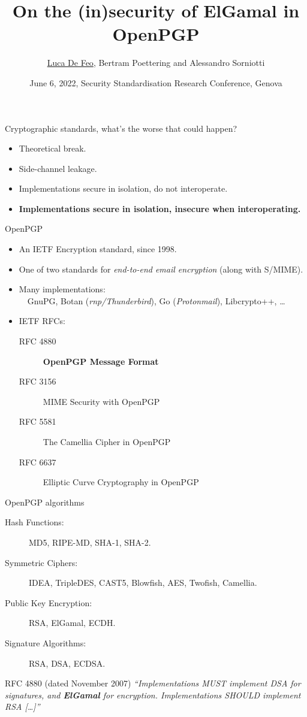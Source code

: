 \documentclass[aspectratio=169]{beamer}
\title{On the (in)security of ElGamal in OpenPGP}
\author[De Feo, Poettering, Sorniotti]{\uline{Luca De Feo}, Bertram Poettering and Alessandro Sorniotti}
\date[June 6, 2022, SSR Genova]{June 6, 2022, Security Standardisation Research Conference, Genova}
\institute[IBM Research]{IBM Research Zürich}
\begin{document}
\frame[plain]{\titlepage}


\begin{frame}{Cryptographic standards, what's the worse that could happen?}
  \large
  \begin{itemize}
    \setlength{\itemsep}{1.2em}
  \item Theoretical break.
  \item Side-channel leakage.
  \item Implementations secure in isolation, do not interoperate.
  \item \bf Implementations secure in isolation, insecure when
    interoperating.
  \end{itemize}
\end{frame}


\begin{frame}{OpenPGP}
  \large
  \begin{itemize}
    \setlength{\itemsep}{1em}
  \item An IETF Encryption standard, since 1998.
  \item One of two standards for \emph{end-to-end email encryption}
    (along with S/MIME).
  \item Many implementations:\\
    ~~GnuPG, Botan (\emph{rnp/Thunderbird}), Go
    (\emph{Protonmail}), Libcrypto++, \dots
  \item IETF RFCs:
    \begin{description}
    \item[RFC 4880 ] \textbf{OpenPGP Message Format}
    \item[RFC 3156 ] MIME Security with OpenPGP
    \item[RFC 5581 ] The Camellia Cipher in OpenPGP
    \item[RFC 6637 ] Elliptic Curve Cryptography in OpenPGP
    \end{description}
  \end{itemize}
\end{frame}


\begin{frame}{OpenPGP algorithms}
  \large
  \begin{description}
  \item[Hash Functions:] MD5, RIPE-MD, SHA-1, SHA-2.
  \item[Symmetric Ciphers:] IDEA, TripleDES, CAST5, Blowfish, AES,
    Twofish, Camellia.
  \item[Public Key Encryption:] RSA, ElGamal, ECDH.
  \item[Signature Algorithms:] RSA, DSA, ECDSA.
  \end{description}

  \bigskip
  
  \begin{block}{RFC 4880 \small(dated November 2007)}
    \it ``Implementations MUST implement DSA for signatures, and
    \textbf{ElGamal} for encryption. Implementations SHOULD implement
    RSA [\dots]''
  \end{block}
\end{frame}
\end{document}
